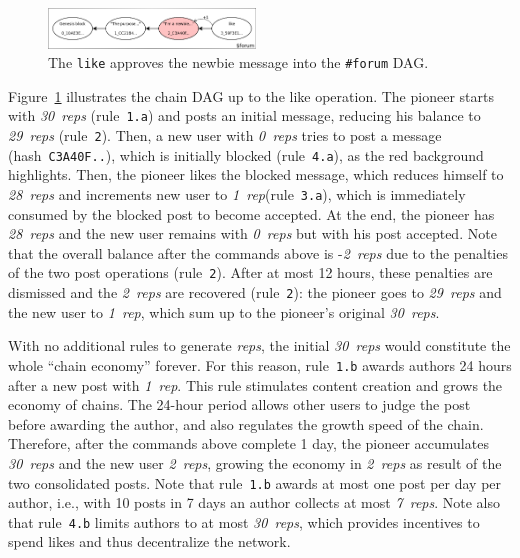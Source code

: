 \documentclass[10pt,journal,compsoc]{IEEEtran}
\newcommand{\reps}     {\emph{reps}\xspace}
\newcommand{\onerep}   {\emph{1~rep}\xspace}
\newcommand{\nreps}[1] {\emph{#1~reps\xspace}}
\begin{document}
\begin{figure}[ht]
\centering
\includegraphics[width=0.49\textwidth]{forum.png}
\caption{
    The \texttt{like} approves the newbie message into the \texttt{\#forum} DAG.
}
\label{fig.forum}
\end{figure}

Figure~\ref{fig.forum} illustrates the chain DAG up to the like operation.
The pioneer starts with \nreps{30} (rule~\texttt{1.a}) and posts an initial
message, reducing his balance to \nreps{29} (rule~\texttt{2}).
Then, a new user with \nreps{0} tries to post a message
(hash~\texttt{C3A40F..}), which is initially blocked (rule~\texttt{4.a}), as
the red background highlights.
Then, the pioneer likes the blocked message, which reduces himself to
\nreps{28} and increments new user to \onerep (rule~\texttt{3.a}), which is
immediately consumed by the blocked post to become accepted.
At the end, the pioneer has \nreps{28} and the new user remains with \nreps{0}
but with his post accepted.
Note that the overall balance after the commands above is -\nreps{2} due to the
penalties of the two post operations (rule~\texttt{2}).
After at most 12 hours, these penalties are dismissed and the \nreps{2} are
recovered (rule~\texttt{2}):
    the pioneer goes to \nreps{29} and the new user to \onerep, which sum up to
    the pioneer's original \nreps{30}.

With no additional rules to generate \reps, the initial \nreps{30} would
constitute the whole ``chain economy'' forever.
For this reason, rule~\texttt{1.b} awards authors 24 hours after a new post
with \onerep.
This rule stimulates content creation and grows the economy of chains.
The 24-hour period allows other users to judge the post before awarding the
author, and also regulates the growth speed of the chain.
Therefore, after the commands above complete 1 day, the pioneer accumulates
\nreps{30} and the new user \nreps{2}, growing the economy in \nreps{2} as
result of the two consolidated posts.
Note that rule~\texttt{1.b} awards at most one post per day per author, i.e.,
with 10 posts in 7 days an author collects at most \nreps{7}.
Note also that rule~\texttt{4.b} limits authors to at most \nreps{30}, which
provides incentives to spend likes and thus decentralize the network.
\end{document}
